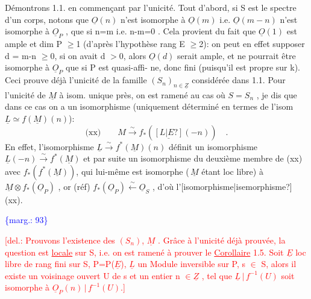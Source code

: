 \documentclass[11pt]{article}
\newcommand{\scanpage}[1]{\par\bigskip\noindent{\small\sffamily[scan #1]}\par}
\newcommand{\mspage}[1]{{\small\sffamily[p.\,#1]}}
\let\over\relax
\newcommand{\over}[2]{\textcolor{gray}{#1}\textcolor{blue}{\ensuremath{^{\!\nearrow}}#2}}
\newcommand{\margin}[1]{\textcolor{blue}{\{\textsf{marg.:} #1\}}}
\newcommand{\deleted}[1]{\textcolor{red}{[\textsf{del.:} #1]}}
\newcommand{\uline}[1]{\underline{#1}}
\newcommand{\unsure}[1]{[#1?]}
\begin{document}
Démontrons  1.1.  en commençant par l'unicité.  Tout d'abord, si S est
le spectre d'un corps, notons que  $\underline{O}(n)$ n'est isomorphe à $\underline{O}(m)$ i.e.
$\underline{O}(m-n)$  n'est  isomorphe à $\underline{O}_P$ , que si  n=m i.e.  n-m=0 .  Cela provient
du fait que $\underline{O}(1)$ est ample et  dim P $\geqslant$1 (d'après l'hypothèse rang E $\geqslant$2):
on peut en effet supposer  d = m-n $\geqslant$0, si on avait d $>$0, alors $\underline{O}(d)$
serait ample, et ne pourrait être isomorphe à  $\underline{O}_P$ que si P est quasi-affi-%
ne, donc fini (puisqu'il est propre sur k).  Ceci prouve déjà  l'unicité
de la famille $(S_n)_{n\in\underline{Z}}$  considérée dans 1.1.  Pour l'unicité de $\underline{M}$ à isom.
unique près, on est ramené au cas où  $S=S_n$ , je dis que dans ce cas on a
un isomorphisme  (uniquement déterminé en termes de l'isom  $\underline{L} \simeq f$\over{$_*$}{$^*$}$(\underline{M})(n)$):
\[ \text{(xx)} \qquad M \xrightarrow{\sim} f_*(\underline{\unsure{L|E}}(-n)) \quad . \]
En effet,  l'isomorphisme  $\underline{L} \xrightarrow{\sim} f^*(\underline{M})(n)$   définit un isomorphisme
$\underline{L}(-n) \xrightarrow{\sim} f^*(\underline{M})$  et par suite un isomorphisme du deuxième membre de (xx)
avec $f_*(f^*(\underline{M}))$, qui lui-même est isomorphe (\,$\underline{M}$ étant loc libre) à
$\underline{M}\otimes f_*(\underline{O}_P)$ , or  (réf)  $f_*(\underline{O}_P) \xleftarrow{\sim} \underline{O}_S$ ,  d'où l'\unsure{isomorphisme|isemorphisme} (xx).

\margin{93}

\clearpage
\scanpage{25/100}
\mspage{3}

\deleted{Prouvons l'existence des $(S_n)$, $\underline{M}$ . Grâce à l'unicité déjà prouvée,
la question est \uline{locale} sur S, i.e. on est ramené à prouver le
\uline{Corollaire} 1.5. Soit $\underline{E}$ loc libre de rang fini sur S, P=P($\underline{E}$), $\underline{L}$ un
Module inversible sur P, s $\in$ S, alors il existe un voisinage ouvert U de s
et un entier n $\in \underline{Z}$ , tel que $\underline{L}\,|\,f^{-1}(U)$ soit isomorphe à $\underline{O}_P(n)\,|\,f^{-1}(U)$.}
\end{document}
